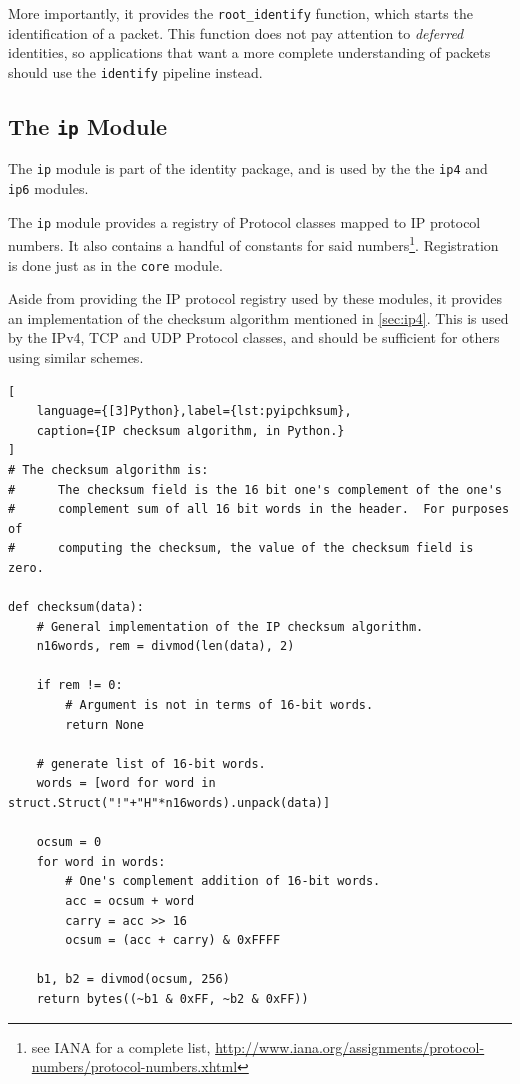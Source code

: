 \documentclass[10pt,a4paper,notitlepage]{report}
\begin{document}
More importantly, it provides the \texttt{root_identify} function, which starts the identification of a packet. This function does not pay attention to \emph{deferred} identities, so applications that want a more complete understanding of packets should use the \texttt{identify} pipeline instead.
 
\subsection{The \texttt{ip} Module}
The \texttt{ip} module is part of the identity package, and is used by the the \texttt{ip4} and \texttt{ip6} modules.

The \texttt{ip} module provides a registry of Protocol classes mapped to IP protocol numbers. It also contains a handful of constants for said numbers\footnote{see IANA for a complete list, \url{http://www.iana.org/assignments/protocol-numbers/protocol-numbers.xhtml}}. Registration is done just as in the \texttt{core} module.

Aside from providing the IP protocol registry used by these modules, it provides an implementation of the checksum algorithm mentioned in \ref{sec:ip4}. This is used by the IPv4, TCP and UDP Protocol classes, and should be sufficient for others using similar schemes.
\begin{lstlisting}[
	language={[3]Python},label={lst:pyipchksum},
	caption={IP checksum algorithm, in Python.}
]
# The checksum algorithm is:
#      The checksum field is the 16 bit one's complement of the one's
#      complement sum of all 16 bit words in the header.  For purposes of
#      computing the checksum, the value of the checksum field is zero.

def checksum(data):
    # General implementation of the IP checksum algorithm.
    n16words, rem = divmod(len(data), 2)

    if rem != 0:
        # Argument is not in terms of 16-bit words.
        return None

    # generate list of 16-bit words.
    words = [word for word in struct.Struct("!"+"H"*n16words).unpack(data)]

    ocsum = 0
    for word in words:
        # One's complement addition of 16-bit words.
        acc = ocsum + word
        carry = acc >> 16
        ocsum = (acc + carry) & 0xFFFF

    b1, b2 = divmod(ocsum, 256)
    return bytes((~b1 & 0xFF, ~b2 & 0xFF))
\end{lstlisting}
\end{document}
